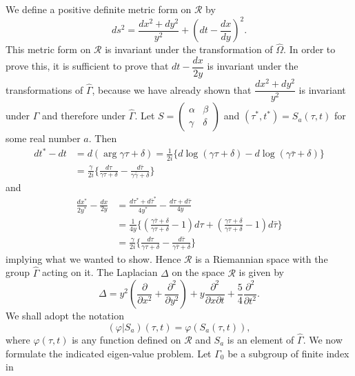 We define a positive definite metric form on $\mathscr{R}$ by 
\begin{equation*}
ds^2 =\frac{dx^2+dy^2}{y^2} + 
(dt -\frac{dx}{dy})^2. \tag{6}\label{c4:eq1:6}
\end{equation*}
This metric form on $\mathscr{R}$ is invariant under the
transformation of $\hat{\Omega}$. In order to prove this, it is
sufficient to prove that $dt-\dfrac{dx}{2y}$ is invariant under the
transformations of $\hat{\Gamma}$, because we have already shown that
$\dfrac{dx^2+dy^2}{y^2}$ is invariant under $\Gamma$ and therefore
under $\hat{\Gamma}$. Let $S =
\left(\begin{smallmatrix} \alpha & \beta\\ \gamma &
  \delta\end{smallmatrix}\right)$ and $(\tau^{\ast},
  t^{\ast})=S_a(\tau,t)$ for some real number $a$. Then
\begin{align*}
dt^{\ast} -dt & = d(\arg\gamma \tau + \delta) = \frac{1}{2i} \{d\log
(\gamma \tau+\delta) - d\log (\gamma \bar{\tau}+\delta)\}\\
& = \frac{\gamma}{2i} \{\frac{d\tau}{\gamma\tau+\delta} -
\frac{d\bar{\tau}}{\gamma \bar{\gamma}+\delta}\}
\end{align*}
and
\begin{align*}
\frac{dx^{\ast}}{2y^{\ast}} - \frac{dx}{2y} & =
\frac{d\tau^{\ast}+d\bar{\tau}^{\ast}}{4y^{\ast}}
-\frac{d\tau+d\bar{\tau}}{4y} \\
& = \frac{1}{4y}
\{(\frac{\gamma\bar{\tau}+\delta}{\gamma\tau+\delta}-1) d\tau +
(\frac{\gamma \tau + \delta}{\gamma \bar{\tau}+\delta}
-1)d\bar{\tau}\}\\
& = \frac{\gamma}{2i} \{\frac{d\tau}{\gamma \tau + \delta} -
\frac{d\bar{\tau}}{\gamma \bar{\tau} + \delta}\}
\end{align*}
implying what we wanted to show. Hence $\mathscr{R}$ is a Riemannian
space with the group $\hat{\Gamma}$ acting on it. The Laplacian
$\Delta$ on the space $\mathscr{R}$ is given by
\begin{equation*}
\Delta = y^2(\frac{\partial}{\partial x^2} +
\frac{\partial^2}{\partial y^2}) + y \frac{\partial^2}{\partial x
  \partial t} + \frac{5}{4} 
\frac{\partial^2}{\partial t^2}. \tag{7}\label{c4:eq1:7}
\end{equation*}
We shall adopt the notation
$$
(\varphi|S_a)(\tau, t) = \varphi(S_a(\tau,t)),
$$\pageoriginale
where $\varphi(\tau,t)$ is any function defined on $\mathscr{R}$ and
$S_a$ is an element of $\hat{\Gamma}$. We now formulate the indicated
eigen-value problem. Let $\Gamma_0$ be a subgroup of finite index in
